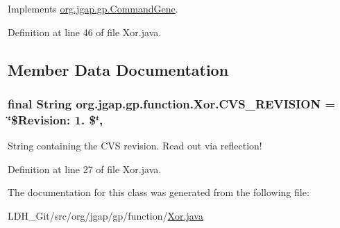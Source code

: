 Implements \hyperlink{classorg_1_1jgap_1_1gp_1_1_command_gene_a236141d99059da808afe7a9217e411c7}{org.\-jgap.\-gp.\-Command\-Gene}.



Definition at line 46 of file Xor.\-java.



\subsection{Member Data Documentation}
\hypertarget{classorg_1_1jgap_1_1gp_1_1function_1_1_xor_a5b0b747f4b1a227d19734b5cbace116c}{
\subsubsection[{C\-V\-S\-\_\-\-R\-E\-V\-I\-S\-I\-O\-N}]{\setlength{\rightskip}{0pt plus 5cm}final String org.\-jgap.\-gp.\-function.\-Xor.\-C\-V\-S\-\_\-\-R\-E\-V\-I\-S\-I\-O\-N = \char`\"{}\$Revision\-: 1. \$\char`\"{}\hspace{0.3cm}{\ttfamily [static]}, {\ttfamily [private]}}}\label{classorg_1_1jgap_1_1gp_1_1function_1_1_xor_a5b0b747f4b1a227d19734b5cbace116c}
String containing the C\-V\-S revision. Read out via reflection! 

Definition at line 27 of file Xor.\-java.



The documentation for this class was generated from the following file\-:\begin{DoxyCompactItemize}
\item 
L\-D\-H\-\_\-\-Git/src/org/jgap/gp/function/\hyperlink{_xor_8java}{Xor.\-java}\end{DoxyCompactItemize}
